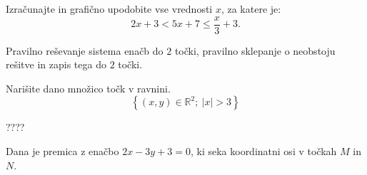 \documentclass[addpoints]{exam}
\begin{document}
\begin{questions}
\newpage
    \question[5]
    Izračunajte in grafično upodobite vse vrednosti $x$, za katere je: 
    $$2x+3<5x+7\leq \dfrac{x}{3}+3.$$


    \begin{solution}[12cm]
        Pravilno reševanje sistema enačb do $2$ točki, pravilno sklepanje o neobstoju rešitve in zapis tega do $2$ točki.
    \end{solution}





    \question[3]
    Narišite dano množico točk v ravnini.
        $$\left\{(x,y)\in\mathbb{R}^2;~\lvert x\rvert >3\right\}$$

            \begin{solution}[2cm]
                ????
            \end{solution}

\newpage

        


    \question
    Dana je premica z enačbo $2x-3y+3=0$, ki seka koordinatni osi v točkah $M$ in $N$.

\end{questions}
\end{document}
